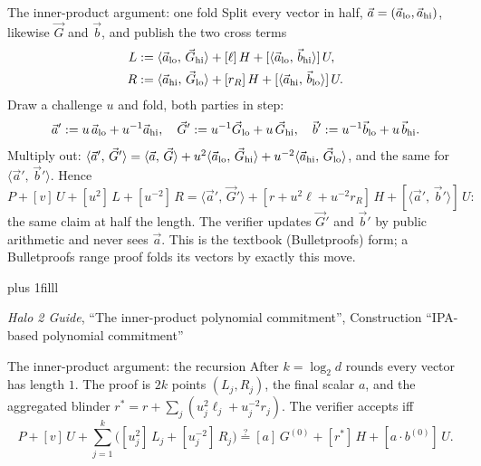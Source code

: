 \documentclass[aspectratio=169,11pt]{beamer}
\newcommand{\ip}[2]{\langle #1,\, #2 \rangle}
\newcommand{\src}[1]{\par\vskip0pt plus 1filll
  {\fontsize{6}{7.2}\selectfont\color{arbdim}\raggedright #1\par}}
\begin{document}
\begin{frame}{The inner-product argument: one fold}
Split every vector in half, $\vec a = (\vec a_{\mathrm{lo}}, \vec a_{\mathrm{hi}})$,
likewise $\vec G$ and $\vec b$, and publish the two cross terms
\begin{align*}
L &:= \ip{\Glo{\vec a}}{\Ghi{\vec G}} + [\ell]\,H
      + [\ip{\Glo{\vec a}}{\Ghi{\vec b}}]\,U, \\
R &:= \ip{\Ghi{\vec a}}{\Glo{\vec G}} + [r_R]\,H
      + [\ip{\Ghi{\vec a}}{\Glo{\vec b}}]\,U .
\end{align*}
Draw a challenge $u$ and fold, both parties in step:
\[
\vec a' := u\,\vec a_{\mathrm{lo}} + u^{-1}\vec a_{\mathrm{hi}}, \quad
\vec G' := u^{-1}\vec G_{\mathrm{lo}} + u\,\vec G_{\mathrm{hi}}, \quad
\vec b' := u^{-1}\vec b_{\mathrm{lo}} + u\,\vec b_{\mathrm{hi}} .
\]
Multiply out: $\ip{\vec a'}{\vec G'} = \ip{\vec a}{\vec G} +
u^2 \ip{\Glo{\vec a}}{\Ghi{\vec G}} + u^{-2} \ip{\Ghi{\vec a}}{\Glo{\vec
G}}$, and the same for $\ip{\vec a'}{\vec b'}$. Hence
\[
P + [v]\,U + [u^2]\,L + [u^{-2}]\,R
= \ip{\vec a'}{\vec G'} + [r + u^2 \ell + u^{-2} r_R]\,H
  + [\ip{\vec a'}{\vec b'}]\,U :
\]
the same claim at half the length. The verifier updates $\vec G'$ and
$\vec b'$ by public arithmetic and never sees $\vec a$. This is the
textbook (Bulletproofs) form; a Bulletproofs range proof folds its
vectors by exactly this move.
\src{\emph{Halo 2 Guide}, ``The inner-product polynomial commitment'',
Construction ``IPA-based polynomial commitment''}
\end{frame}

\begin{frame}{The inner-product argument: the recursion}
After $k = \log_2 d$ rounds every vector has length $1$. The proof is
$2k$ points $(L_j, R_j)$, the final scalar $a$, and the aggregated
blinder $r^{*} = r + \sum_j (u_j^2 \ell_j + u_j^{-2} r_j)$. The verifier
accepts iff
\[
P + [v]\,U + \sum_{j=1}^{k}\bigl([u_j^2]\,L_j + [u_j^{-2}]\,R_j\bigr)
\overset{?}{=} [a]\,G^{(0)} + [r^{*}]\,H + [a \cdot b^{(0)}]\,U .
\]
\end{frame}
\end{document}
